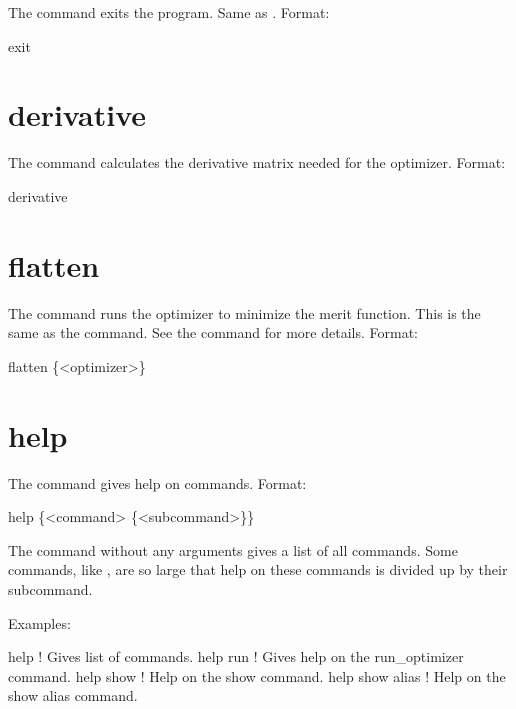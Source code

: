 The  command exits the program. Same as .  Format:
\begin{example}
  exit
\end{example}

\section{derivative}
\label{s:deriv}

The  command calculates the  derivative matrix needed for the
 optimizer.  Format:
\begin{example}
  derivative
\end{example}

\section{flatten}
\label{s:flatten}

The  command runs the optimizer to minimize the merit function. This is the same as the
 command.  See the  command for more details. Format:
\begin{example}
  flatten \{<optimizer>\}
\end{example}

\vskip 10pt

\section{help}
\label{s:help}

The  command gives help on \tao commands. Format:
\begin{example}
  help \{<command> \{<subcommand>\}\}
\end{example}

\vskip 10pt
The  command without any arguments gives a list of all commands.  Some commands, like
, are so large that help on these commands is divided up by their subcommand.

Examples:
\begin{example}
  help            ! Gives list of commands.
  help run        ! Gives help on the run_optimizer command.
  help show       ! Help on the show command.
  help show alias ! Help on the show alias command.
\end{example}

